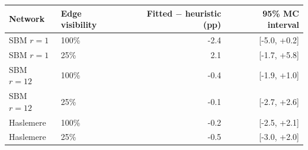 \begin{tabular}{llrr}\toprule
Network & Edge visibility & Fitted $-$ heuristic (pp) & 95\% MC interval\\\midrule
SBM $r=1$ & 100\% & -2.4 & [-5.0, +0.2]\\
SBM $r=1$ & 25\% & 2.1 & [-1.7, +5.8]\\
SBM $r=12$ & 100\% & -0.4 & [-1.9, +1.0]\\
SBM $r=12$ & 25\% & -0.1 & [-2.7, +2.6]\\
Haslemere & 100\% & -0.2 & [-2.5, +2.1]\\
Haslemere & 25\% & -0.5 & [-3.0, +2.0]\\
\bottomrule\end{tabular}
